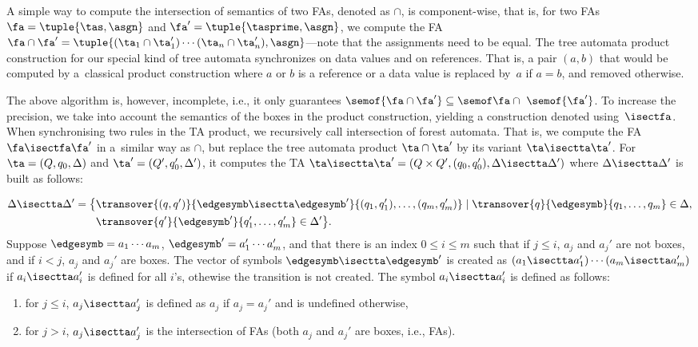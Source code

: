 {A simple way to compute 
%
%
%
the intersection of semantics of two FAs, denoted as $\cap$, is com\-po\-nent-wise, 
that is, for two FAs $\fa = \tuple{\tas,\asgn}$ and $\fa' = \tuple{\tasprime,\asgn}$,
we compute the FA $\fa\cap\fa' =
\tuple{(\ta_1\cap\ta_1')\cdots(\ta_n\cap\ta_n'), \asgn}$---note that the assignments need to be equal.
%
The tree automata product construction for our special kind of tree automata
synchronizes on data values and on references.
That is, a pair $(a,b)$ that would be computed by a~classical product
construction where $a$ or $b$ is a reference or a data value is replaced by~$a$
if $a = b$, and removed otherwise.

The above algorithm is, however, incomplete, i.e., it only guarantees $\semof{\fa\cap\fa'}\subseteq\semof\fa\cap~\semof{\fa'}$.
%
To increase the precision, we take into account the semantics of the boxes in
the product construction, yielding a construction denoted using~$\isectfa$.
When synchronising two rules in the TA product, we recursively call intersection of forest automata.
%
That is, we compute the FA $\fa\isectfa\fa'$ in a~similar way as $\cap$, but replace the tree
automata product $\ta\cap\ta'$ by its variant $\ta\isectta\ta'$.
For $\ta = (Q, q_0, \Delta)$ and $\ta' = (Q',q_0', \Delta')$, it computes the  TA
$\ta\isectta\ta' = (Q \times Q', (q_0, q_0'), \Delta\isectta\Delta')$ where
$\Delta\isectta\Delta'$ is built as follows:

\eject

    \begin{align*}
    \Delta\isectta\Delta' = \big\{ & \transover{(q, q')}{\edgesymb\isectta\edgesymb'}{(q_1, q'_1), \ldots,
      (q_m, q'_m)} \mid \transover{q}{\edgesymb}{q_1, \ldots, q_m}
      \in \Delta,\\
      &
      \transover{q'}{\edgesymb'}{q'_1, \ldots, q'_m} \in \Delta'
      \big\}.\vspace*{-1mm}
    \end{align*}
    Suppose $\edgesymb = a_1 \cdots a_m$, $\edgesymb' = a_1' \cdots
    a_m'$, and that there is an index $0 \leq i \leq m$ such that if $
    j \leq i$, $a_j$ and $a_j'$ are not boxes, and if $i < j
    $, $a_j$ and $a_j'$ are boxes.
    The vector of symbols $\edgesymb \isectta \edgesymb'$ is created as
    $(a_1\isectta a_1') \cdots (a_m\isectta a_m')$ if $a_i\isectta a_i'$ is
    defined for all $i$'s, othewise the transition is not created.
    The symbol $a_i\isectta a_i'$ is defined as follows:
    \begin{enumerate}
      \item  for $j \leq i$, $a_j\isectta a_j'$ is defined as $a_j$ if $a_j = a_j'$ and is undefined otherwise,
      \item  for $j > i$, $a_j\isectta a_j'$ is the intersection of FAs (both
        $a_j$ and $a_j'$ are boxes, i.e., FAs).
    \end{enumerate}


}
